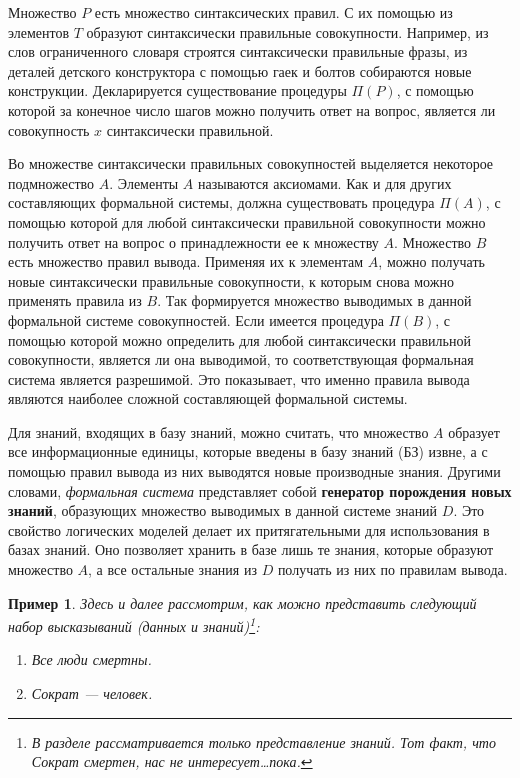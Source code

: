 \documentclass[12pt, openany, twoside]{book} %
\newtheorem{example}{Пример}[chapter]
\begin{document}
Множество $P$ есть множество синтаксических правил. С их помощью из элементов $T$ образуют синтаксически правильные совокупности. Например, из слов ограниченного словаря строятся синтаксически правильные фразы, из деталей детского конструктора с помощью гаек и болтов собираются новые конструкции. Декларируется существование процедуры $\Pi(P)$, с помощью которой за конечное число шагов можно получить ответ на вопрос, является ли совокупность $x$ синтаксически правильной.

Во множестве синтаксически правильных совокупностей выделяется некоторое подмножество $A$. Элементы $A$ называются аксиомами. Как и для других составляющих формальной системы, должна существовать процедура $\Pi(A)$, с помощью которой для любой синтаксически правильной совокупности можно получить ответ на вопрос о принадлежности ее к множеству $A$. Множество $B$ есть множество правил вывода. Применяя их к элементам $A$, можно получать новые синтаксически правильные совокупности, к которым снова можно применять правила из $B$. Так формируется множество выводимых в данной формальной системе совокупностей. Если имеется процедура $\Pi(B)$, с помощью которой можно определить для любой синтаксически правильной совокупности, является ли она выводимой, то соответствующая формальная система является разрешимой. Это показывает, что именно правила вывода являются наиболее сложной составляющей формальной системы.

Для знаний, входящих в базу знаний, можно считать, что множество $A$ образует все информационные единицы, которые введены в базу знаний (БЗ) извне, а с помощью правил вывода из них выводятся новые производные знания. Другими словами, {\em формальная система} представляет собой {\bf генератор порождения новых знаний}, образующих множество выводимых в данной системе знаний $D$. Это свойство логических моделей делает их притягательными для использования в базах знаний. Оно позволяет хранить в базе лишь те знания, которые образуют множество $A$, а все остальные знания из $D$ получать из них по правилам вывода.

\begin{example} Здесь и далее рассмотрим, как можно представить следующий набор высказываний (данных и знаний)\footnote{В разделе рассматривается только представление знаний. Тот факт, что Сократ смертен, нас не интересует\ldots пока.}:
\label{ex:repr:main}
\begin{enumerate}
\item Все люди смертны.
\item Сократ --- человек.
\end{enumerate}
\end{example}
\end{document}
